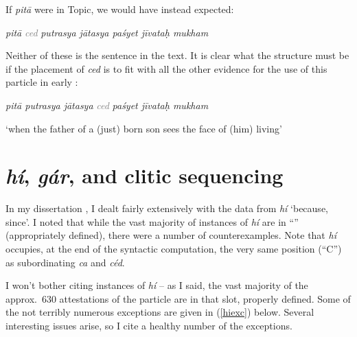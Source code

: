 \documentclass[output=paper,
modfonts
]{LSP/langsci}
\begin{document}
If \textit{pitā} were in Topic, we would have instead expected:

\vspace*{2ex}
\begin{exe}\ex
{\ob} \textit{pitā}{\cb} {\ob} {\textcolor{gray}{\textit{ced}}} {\ob}\textit{putrasya  jātasya paśyet jīvataḥ mukham}{\cb}{\cb} 
\end{exe}


\noindent Neither of these is the sentence in the text. It is clear what the structure must be if the placement of \textit{ced}
is to fit with all the other evidence for the use of this particle in early :

\begin{exe}\ex
{\ob} \textit{pitā putrasya jātasya}{\cb} {\ob} {\textcolor{gray}{\textit{ced}}} {\ob}\textit{paśyet  jīvataḥ mukham}{\cb}{\cb} 

`when the father of a (just) born son sees the face of (him) living'
\end{exe}

\section{\textit{hí}, \textit{gár}, and clitic sequencing}

In my dissertation \citep{hale1987}, I dealt fairly extensively with the data from  \textit{hí}
`because, since'. I noted that while the vast majority of instances of \textit{hí} are in ``'' (appropriately
defined), there were a number of counterexamples. Note that \textit{hí} occupies, at the end of the syntactic computation,
the very same position (``C'') as subordinating \textit{ca} and \textit{céd}.

I won't bother citing  instances of \textit{hí} -- as I said,
the vast majority of the approx.\ 630 attestations of the particle are in that slot, properly defined. Some of the
not terribly numerous exceptions are given in (\ref{hiexc}) below. Several interesting issues arise, so I cite a
healthy number of the exceptions.
\end{document}
